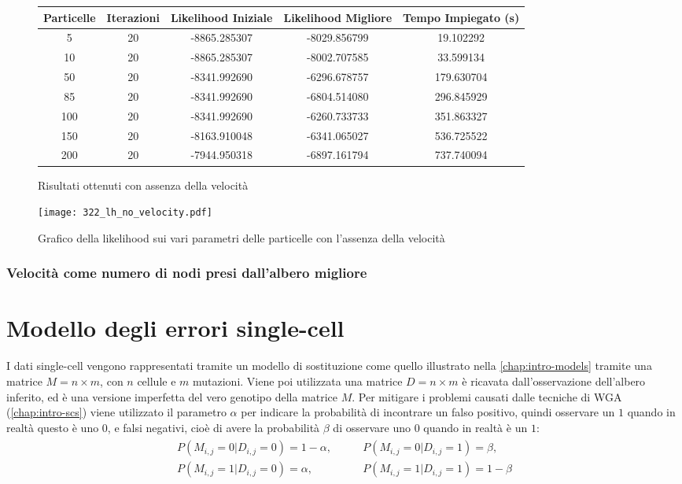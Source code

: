 \begin{figure}[!h]
  \centering
  \begin{tabular}{*{5}{c}}
    Particelle & Iterazioni & Likelihood Iniziale & Likelihood Migliore & Tempo Impiegato (s) \\ \midrule \midrule
    5 & 20 & -8865.285307 & -8029.856799 & 19.102292 \\
    10 & 20 & -8865.285307 & -8002.707585 & 33.599134 \\
    50 & 20 & -8341.992690 & -6296.678757 & 179.630704 \\
    85 & 20 & -8341.992690 & -6804.514080 & 296.845929 \\
    100 & 20 & -8341.992690 & -6260.733733 & 351.863327 \\
    150 & 20 & -8163.910048 & -6341.065027 & 536.725522 \\
    200 & 20 & -7944.950318 & -6897.161794 & 737.740094
  \end{tabular}
  \caption{Risultati ottenuti con assenza della velocità}
  \label{fig:pso-adapt-calculate-1-table}
\end{figure}
\begin{figure}[!h]
  \centering
  \texttt{[image: 322\_lh\_no\_velocity.pdf]}
  \caption{Grafico della likelihood sui vari parametri delle particelle con l'assenza della velocità}
  \label{fig:pso-adapt-calculate-1-graph}
\end{figure}

\subsubsection{Velocità come numero di nodi presi dall'albero migliore}

\section{Modello degli errori single-cell}
\label{chap:pso-matrix}
I dati single-cell vengono rappresentati tramite un modello di sostituzione come quello illustrato nella \autoref{chap:intro-models} tramite una matrice $M = n \times m$, con $n$ cellule e $m$ mutazioni. Viene poi utilizzata una matrice $D = n \times m$ è ricavata dall'osservazione dell'albero inferito, ed è una versione imperfetta del vero genotipo della matrice $M$. Per mitigare i problemi causati dalle tecniche di WGA (\autoref{chap:intro-scs}) viene utilizzato il parametro $\alpha$ per indicare la probabilità di incontrare un falso positivo, quindi osservare un $1$ quando in realtà questo è uno $0$, e falsi negativi, cioè di avere la probabilità $\beta$ di osservare uno $0$ quando in realtà è un $1$:
\begin{align}
    \label{eq:pso-intro-model-matrix}
    \begin{split}
      P(M_{i,j} = 0 | D_{i,j} = 0) = 1 - \alpha, \qquad
      &P(M_{i,j} = 0 | D_{i,j} = 1) = \beta, \\
      P(M_{i,j} = 1 | D_{i,j} = 0) = \alpha, \qquad
      &P(M_{i,j} = 1 | D_{i,j} = 1) = 1 - \beta
    \end{split}
\end{align}

